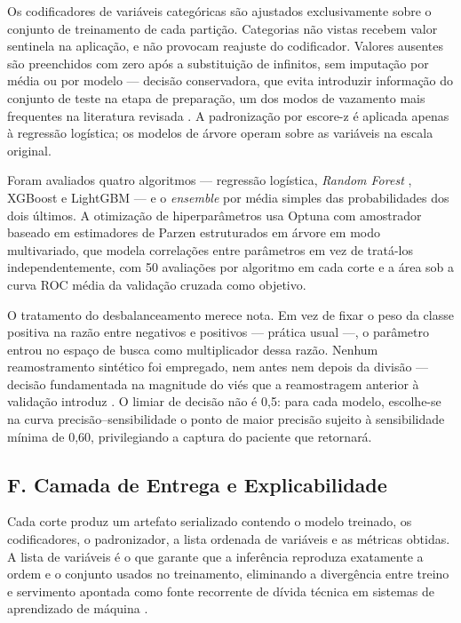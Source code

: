 \documentclass{ieeeaccess}
\begin{document}
Os codificadores de variáveis categóricas são ajustados exclusivamente sobre o conjunto de treinamento de cada partição. Categorias não vistas recebem valor sentinela na aplicação, e não provocam reajuste do codificador. Valores ausentes são preenchidos com zero após a substituição de infinitos, sem imputação por média ou por modelo --- decisão conservadora, que evita introduzir informação do conjunto de teste na etapa de preparação, um dos modos de vazamento mais frequentes na literatura revisada \cite{Kapoor2023}. A padronização por escore-z é aplicada apenas à regressão logística; os modelos de árvore operam sobre as variáveis na escala original.

Foram avaliados quatro algoritmos --- regressão logística, \textit{Random Forest} \cite{Breiman2001}, XGBoost \cite{Chen2016} e LightGBM \cite{Ke2017} --- e o \textit{ensemble} por média simples das probabilidades dos dois últimos. A otimização de hiperparâmetros usa Optuna \cite{Akiba2019} com amostrador baseado em estimadores de Parzen estruturados em árvore \cite{Bergstra2011} em modo multivariado, que modela correlações entre parâmetros em vez de tratá-los independentemente, com 50 avaliações por algoritmo em cada corte e a área sob a curva ROC média da validação cruzada como objetivo.

O tratamento do desbalanceamento merece nota. Em vez de fixar o peso da classe positiva na razão entre negativos e positivos --- prática usual ---, o parâmetro entrou no espaço de busca como multiplicador dessa razão. Nenhum reamostramento sintético foi empregado, nem antes nem depois da divisão --- decisão fundamentada na magnitude do viés que a reamostragem anterior à validação introduz \cite{Demircioglu2024}. O limiar de decisão não é 0,5: para cada modelo, escolhe-se na curva precisão--sensibilidade o ponto de maior precisão sujeito à sensibilidade mínima de 0,60, privilegiando a captura do paciente que retornará.

\subsection*{F. Camada de Entrega e Explicabilidade}
Cada corte produz um artefato serializado contendo o modelo treinado, os codificadores, o padronizador, a lista ordenada de variáveis e as métricas obtidas. A lista de variáveis é o que garante que a inferência reproduza exatamente a ordem e o conjunto usados no treinamento, eliminando a divergência entre treino e servimento apontada como fonte recorrente de dívida técnica em sistemas de aprendizado de máquina \cite{Sculley2015}.
\end{document}
